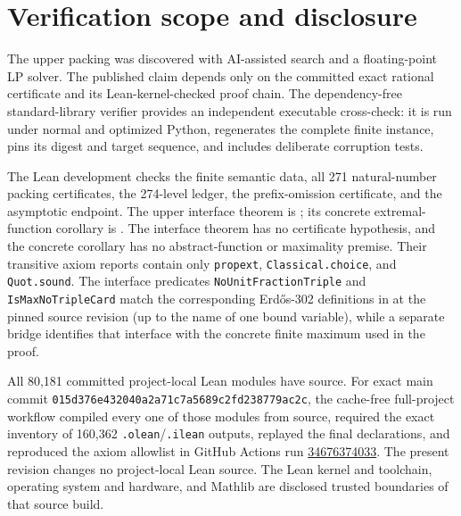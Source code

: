 \documentclass[11pt]{article}
\theoremstyle{definition}
\theoremstyle{plain}
\begin{document}
\section{Verification scope and disclosure}

The upper packing was discovered with AI-assisted search and a
floating-point LP solver.  The published claim depends only on the committed
exact rational certificate and its Lean-kernel-checked proof chain.  The
dependency-free standard-library verifier provides an independent executable
cross-check: it is run under normal and optimized Python, regenerates the
complete finite instance, pins its digest and target sequence, and includes
deliberate corruption tests.
\begin{sloppypar}
The Lean development checks the finite semantic
data, all 271 natural-number packing certificates, the 274-level ledger, the
prefix-omission certificate, and the asymptotic endpoint.  The upper interface
theorem is
; its
concrete extremal-function corollary is
.  The interface
theorem has no certificate hypothesis, and the concrete corollary has no
abstract-function or maximality premise.  Their transitive axiom reports contain
only \texttt{propext}, \texttt{Classical.choice}, and \texttt{Quot.sound}.  The
interface predicates \texttt{NoUnitFractionTriple} and
\texttt{IsMaxNoTripleCard} match
the corresponding Erd\H{o}s-302 definitions in
 at the pinned source revision (up
to the name of one bound variable), while a separate bridge identifies that
interface with the concrete finite maximum used in the proof.
\end{sloppypar}

All 80,181 committed project-local Lean modules have source.  For exact main
commit \texttt{015d376e432040a2a71c7a5689c2fd238779ac2c}, the cache-free
full-project workflow compiled every one of those modules from source,
required the exact inventory of 160,362 \texttt{.olean}/\texttt{.ilean}
outputs, replayed the final declarations, and reproduced the axiom allowlist
in GitHub Actions run
\href{https://github.com/khanukov/erdos302/actions/runs/34676374033}{34676374033}.
The present revision changes no project-local Lean source.
The Lean kernel and toolchain, operating system and hardware, and Mathlib are
disclosed trusted boundaries of that source build.
\end{document}
